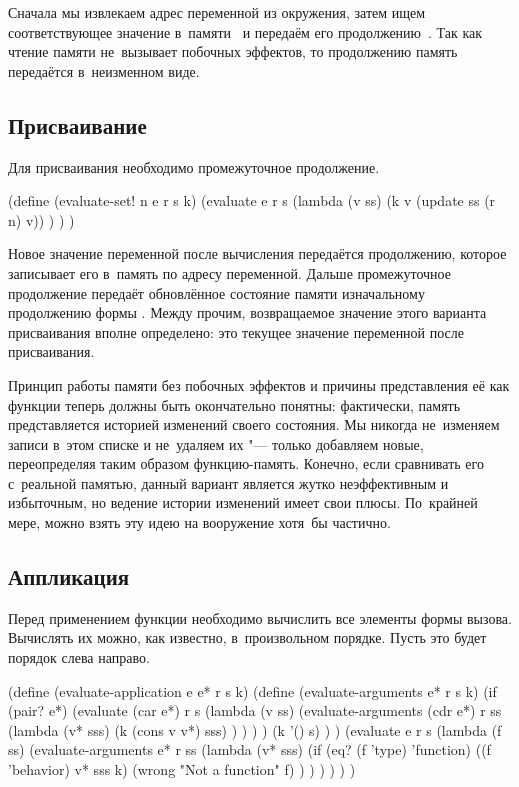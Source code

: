 Сначала мы извлекаем адрес переменной  из окружения, затем ищем
соответствующее значение в~памяти~ и передаём его продолжению~. Так
как чтение памяти не~вызывает побочных эффектов, то продолжению память
передаётся в~неизменном виде.


\subsection{Присваивание}\label{assignment/implementation/ssect:assignment}

Для присваивания необходимо промежуточное продолжение.

\begin{code:lisp}
(define (evaluate-set! n e r s k)
  (evaluate e r s
    (lambda (v ss)
      (k v (update ss (r n) v)) ) ) )
\end{code:lisp}

Новое значение переменной после вычисления передаётся продолжению, которое
записывает его в~память по адресу переменной. Дальше промежуточное продолжение
передаёт обновлённое состояние памяти изначальному продолжению формы .
Между прочим, возвращаемое значение этого варианта присваивания вполне
определено: это текущее значение переменной после присваивания.

Принцип работы памяти без побочных эффектов и причины представления её как
функции теперь должны быть окончательно понятны: фактически, память
представляется историей изменений своего состояния. Мы никогда не~изменяем
записи в~этом списке и не~удаляем их "--- только добавляем новые, переопределяя
таким образом функцию-память. Конечно, если сравнивать его с~реальной памятью,
данный вариант является жутко неэффективным и избыточным, но ведение истории
изменений имеет свои плюсы.  По~крайней
мере, можно взять эту идею на вооружение хотя~бы частично.


\subsection{Аппликация}\label{assignment/implementation/ssect:application}

Перед применением функции необходимо вычислить все элементы формы вызова.
Вычислять их можно, как известно, в~произвольном порядке. Пусть это будет
порядок слева направо.

\begin{code:lisp}
(define (evaluate-application e e* r s k)
  (define (evaluate-arguments e* r s k)
    (if (pair? e*)
        (evaluate (car e*) r s
          (lambda (v ss)
            (evaluate-arguments (cdr e*) r ss
              (lambda (v* sss)
                (k (cons v v*) sss) ) ) ) )
        (k '() s) ) )
  (evaluate e r s
    (lambda (f ss)
      (evaluate-arguments e* r ss
        (lambda (v* sss)
          (if (eq? (f 'type) 'function)
              ((f 'behavior) v* sss k)
              (wrong "Not a function" f) ) ) ) ) ) )
\end{code:lisp}

